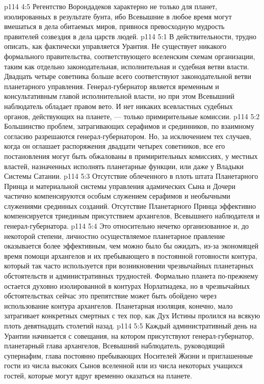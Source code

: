 \vs p114 4:5 Регентство Ворондадеков характерно не только для планет, изолированных в результате бунта, ибо Всевышние в любое время могут вмешаться в дела обитаемых миров, привнося превосходную мудрость правителей созвездия в дела царств людей.
\vs p114 5:1 В действительности, трудно описать, как фактически управляется Урантия. Не существует никакого формального правительства, соответствующего вселенским схемам организации, таким как отдельно законодательная, исполнительная и судебная ветви власти. Двадцать четыре советника больше всего соответствуют законодательной ветви планетарного управления. Генерал\hyp{}губернатор является временным и консультативным главой исполнительной власти, но при этом Всевышний наблюдатель обладает правом вето. И нет никаких всевластных судебных органов, действующих на планете, --- только примирительные комиссии.
\vs p114 5:2 Большинство проблем, затрагивающих серафимов и срединников, по взаимному согласию разрешаются генерал\hyp{}губернатором. Но, за исключением тех случаев, когда он оглашает распоряжения двадцати четырех советников, все его постановления могут быть обжалованы в примирительных комиссиях, у местных властей, назначенных исполнять планетарные функции, или даже у Владыки Системы Сатании.
\vs p114 5:3 Отсутствие облеченного в плоть штата Планетарного Принца и материальной системы управления адамических Сына и Дочери частично компенсируются особым служением серафимов и необычными служениями срединных созданий. Отсутствие Планетарного Принца эффективно компенсируется триединым присутствием архангелов, Всевышнего наблюдателя и генерал\hyp{}губернатора.
\vs p114 5:4 Это относительно нечетко организованное и, до некоторой степени, личностно осуществляемое планетарное правление оказывается более эффективным, чем можно было бы ожидать, из\hyp{}за экономящей время помощи архангелов и их пребывающего в постоянной готовности контура, который так часто используется при возникновении чрезвычайных планетарных обстоятельств и административных трудностей. Формально планета по\hyp{}прежнему остается духовно изолированной в контурах Норлатиадека, но в чрезвычайных обстоятельствах сейчас это препятствие может быть обойдено через использование контура архангелов. Планетарная изоляция, конечно, мало затрагивает конкретных смертных с тех пор, как Дух Истины пролился на всякую плоть девятнадцать столетий назад.
\vs p114 5:5 \pc Каждый административный день на Урантии начинается с совещания, на котором присутствуют генерал\hyp{}губернатор, планетарный глава архангелов, Всевышний наблюдатель, руководящий супернафим, глава постоянно пребывающих Носителей Жизни и приглашенные гости из числа высоких Сынов вселенной или из числа некоторых учащихся гостей, которые могут вдруг временно оказаться на планете.
